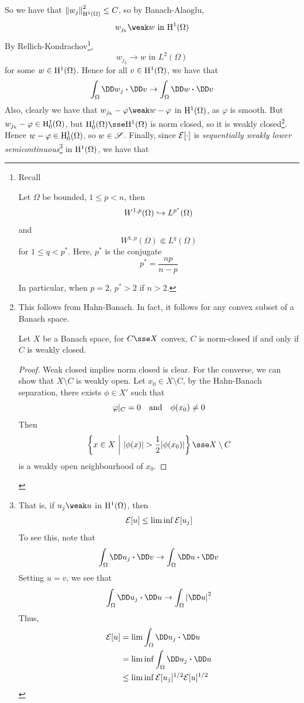 \documentclass{article}
\begin{document}
So we have that \(\norm{w_j}_{\mathrm{H}^1(\Omega)}^2 \le C\), so by Banach-Alaoglu,
\[w_{j_k} \weak w \text{ in }\HH^1(\Omega)\]
By Rellich-Kondrachov\footnote{Recall \begin{theorem}
     Let \(\Omega\) be bounded, \(1 \le p < n\), then
    \[W^{1, p}(\Omega) \hookrightarrow L^{p^*}(\Omega)\]
    and
    \[W^{1, p}(\Omega) \Subset L^q(\Omega)\]
    for \(1 \le q < p^*\). Here, \(p^*\) is the conjugate
    \[p^* = \frac{np}{n - p}\]
\end{theorem}
In particular, when \(p = 2\), \(p^* > 2\) if \(n > 2\).},
\[w_{j_k} \to w \text{ in }L^2(\Omega)\]
for some \(w \in \mathrm{H}^1(\Omega)\). Hence for all \(v \in \mathrm{H}^1(\Omega)\), we have that
\[\int_{\Omega}\DD w_j \vdot \DD v \to \int_\Omega \DD w \vdot \DD v\]
Also, clearly we have that \(w_{j_k} - \varphi \weak w - \varphi\) in \(\mathrm{H}^1(\Omega)\), as \(\varphi\) is smooth. But \(w_{j_k} - \varphi \in \mathrm{H}^1_0(\Omega)\), but \(\HH^1_0(\Omega)\sse \HH^1(\Omega)\) is norm closed, so it is weakly closed\footnote{This follows from Hahn-Banach. In fact, it follows for any convex subset of a Banach space.

\begin{lemma}
    Let \(X\) be a Banach space, for \(C \sse X\) convex, \(C\) is norm-closed if and only if \(C\) is weakly closed.
\end{lemma}
\begin{proof}
    Weak closed implies norm closed is clear. For the converse, we can show that \(X \setminus C\) is weakly open. Let \(x_0 \in X\setminus C\), by the Hahn-Banach separation, there exists \(\phi \in X'\) such that
    \[\varphi\vert_{C} = 0 \qqtext{and}\phi(x_0) \ne 0\]
    Then
    \[\left\{x \in X \ \bigg\vert\ \abs{\phi(x)} > \frac{1}{2}\abs{\phi(x_0)}\right\} \sse X \setminus C\]
    is a weakly open neighbourhood of \(x_0\).
\end{proof}}.
Hence \(w - \varphi \in \mathrm{H}^1_0(\Omega)\), so \(w \in \mathscr{S}\). Finally, since \(\mathcal{E}[\cdot]\) is \emph{sequentially weakly lower semicontinuous}\footnote{
    That is, if \(u_j \weak u\) in \(\mathrm{H}^1(\Omega)\), then
    \[\mathcal{E}[u] \le \liminf \mathcal{E}[u_j]\]
    To see this, note that
    \[\int_\Omega\DD u_j \vdot \DD v \to \int_\Omega \DD u \vdot \DD v\]
    Setting \(u = v\), we see that
    \[\int_\Omega\DD u_j \vdot \DD u \to \int_\Omega \abs{\DD u}^2\]
    Thus,
    \begin{align*}
        \mcE[u] &= \lim\int_\Omega \DD u_j \vdot \DD u \\
        &= \liminf \int_\Omega \DD u_j \vdot \DD u \\
        &\le \liminf \mcE[u_j]^{1/2}\mcE[u]^{1/2}
    \end{align*}
} in \(\mathrm{H}^1(\Omega)\), we have that
\end{document}
